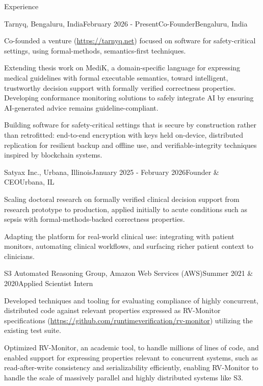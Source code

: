 \documentclass{resume} %
\begin{document}
\begin{rSection}{Experience}

\begin{rSubsection}{Tarnyq, Bengaluru, India}{February 2026 - Present}{Co-Founder}{Bengaluru, India}
\item Co-founded a venture (\url{https://tarnyq.net}) focused on software for
  safety-critical settings, using formal-methods, semantics-first techniques.
\item Extending thesis work on MediK, a domain-specific language for expressing
  medical guidelines with formal executable semantics, toward intelligent,
  trustworthy decision support with formally verified correctness properties.
  Developing conformance monitoring solutions to safely integrate AI by ensuring
  AI-generated advice remains guideline-compliant.
\item Building software for safety-critical settings that is secure by
  construction rather than retrofitted: end-to-end encryption with keys held
  on-device, distributed replication for resilient backup and offline use, and
  verifiable-integrity techniques inspired by blockchain systems.
\end{rSubsection}

\begin{rSubsection}{Satyax Inc., Urbana, Illinois}{January 2025 - February 2026}{Founder \& CEO}{Urbana, IL}
\item Scaling doctoral research on formally verified clinical decision support
  from research prototype to production, applied initially to acute conditions
  such as sepsis with formal-methods-backed correctness properties.
\item Adapting the platform for real-world clinical use: integrating with patient
  monitors, automating clinical workflows, and surfacing richer patient context
  to clinicians.
\end{rSubsection}

\begin{rSubsection}{S3 Automated Reasoning Group, Amazon Web Services
  (AWS)}{Summer 2021 \& 2020}{Applied Scientist Intern}{}
\item Developed techniques and tooling for evaluating compliance of highly concurrent, distributed code
  against relevant properties expressed as RV-Monitor specifications
  (\url{https://github.com/runtimeverification/rv-monitor}) utilizing the existing test suite.
\item Optimized RV-Monitor, an academic tool, to handle millions of lines of
  code, and enabled support for expressing properties relevant to concurrent systems,
    such as read-after-write consistency and serializability efficiently,
    enabling RV-Monitor to handle the scale of massively parallel
    and highly distributed systems like S3.


\end{rSubsection}
\end{rSection}
\end{document}
